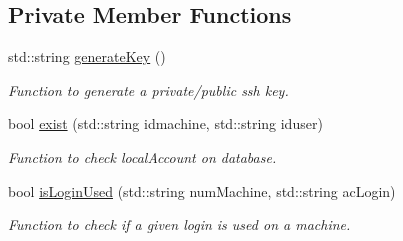 \subsection*{Private Member Functions}
\begin{DoxyCompactItemize}
\item 
\hypertarget{classLocalAccountServer_a2cbcd93a4b1dcd0cdc85bbfc08338356}{
std::string \hyperlink{classLocalAccountServer_a2cbcd93a4b1dcd0cdc85bbfc08338356}{generateKey} ()}
\label{classLocalAccountServer_a2cbcd93a4b1dcd0cdc85bbfc08338356}

\begin{DoxyCompactList}\small\item\em Function to generate a private/public ssh key. \item\end{DoxyCompactList}\item 
bool \hyperlink{classLocalAccountServer_a5d6c7a0b3ce13905d606046ecf57d56e}{exist} (std::string idmachine, std::string iduser)
\begin{DoxyCompactList}\small\item\em Function to check localAccount on database. \item\end{DoxyCompactList}\item 
bool \hyperlink{classLocalAccountServer_ad7a279ae0448c51365bf5a11e0c85470}{isLoginUsed} (std::string numMachine, std::string acLogin)
\begin{DoxyCompactList}\small\item\em Function to check if a given login is used on a machine. \item\end{DoxyCompactList}\end{DoxyCompactItemize}
